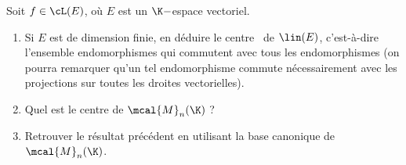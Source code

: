 Soit $f\in \cL(E)$, où $E$ est un $\K-$espace vectoriel.

\begin{enumerate}
\item Si $E$ est de dimension finie, en déduire le \og centre \fg\ de $\lin(E)$, c'est-à-dire l'ensemble endomorphismes qui commutent avec tous les endomorphismes (on pourra remarquer qu'un tel endomorphisme commute nécessairement avec les projections sur toutes les droites vectorielles).
\item Quel est le centre de $\mcal{M}_n(\K)$ ?
\item Retrouver le résultat précédent en utilisant la base canonique de $\mcal{M}_n(\K)$.
\end{enumerate}

